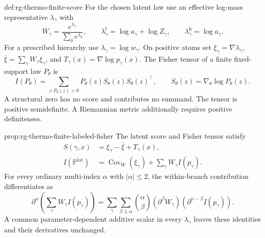 {def:rg-thermo-finite-score}
For the chosen latent law use an effective log-mass representative
$\lambda_\gamma$ with
\begin{equation}
 W_\gamma=\frac{e^{\lambda_\gamma}}
                 {\sum_\delta e^{\lambda_\delta}},
 \qquad
 \lambda_\gamma^{\mathrm f}=\log a_\gamma+\log Z_\gamma,
 \qquad
 \lambda_\gamma^{\mathrm h}=\log a_\gamma.
 \label{eq:rg-thermo-finite-log-masses}
\end{equation}
For a prescribed hierarchy use $\lambda_\gamma=\log w_\gamma$.
On positive atoms set $\xi_\gamma=\nabla\lambda_\gamma$,
$\overline\xi=\sum_\gamma W_\gamma\xi_\gamma$, and
$T_\gamma(x)=\nabla\log p_\gamma(x)$. The Fisher tensor of a finite
fixed-support law $P_\theta$ is
\begin{equation}
 I(P_\theta)=\sum_{z:P_\theta(z)>0}P_\theta(z)
       S_\theta(z)S_\theta(z)^\top,
 \qquad S_\theta(z)=\nabla_\theta\log P_\theta(z).
 \label{eq:rg-thermo-finite-fisher-definition}
\end{equation}
A structural zero has no score and contributes no summand. The tensor is
positive semidefinite. A Riemannian metric additionally requires positive
definiteness. 

{prop:rg-thermo-finite-labeled-fisher}
The latent score and Fisher tensor satisfy
\begin{align}
 S(\gamma,x)
 &=\xi_\gamma-\overline\xi+T_\gamma(x),
 \label{eq:rg-thermo-finite-complete-score}\\
 I(\mathbb P^{\mathrm{lat}})
 &=\operatorname{Cov}_W(\xi_\gamma)
     +\sum_\gamma W_\gamma I(p_\gamma).
 \label{eq:rg-thermo-finite-labeled-fisher}
\end{align}
For every ordinary multi-index $\alpha$ with $|\alpha|\leq2$, the
within-branch contribution differentiates as
\begin{equation}
 \partial^\alpha\left(\sum_\gamma W_\gamma I(p_\gamma)\right)
 =\sum_\gamma\sum_{\beta\leq\alpha}
 {\alpha\choose\beta}
 (\partial^\beta W_\gamma)
 (\partial^{\alpha-\beta}I(p_\gamma)).
 \label{eq:rg-thermo-finite-weighted-fisher-derivatives}
\end{equation}
A common parameter-dependent additive scalar in every
$\lambda_\gamma$ leaves these identities and their derivatives unchanged.\thermoestablishedstatus


